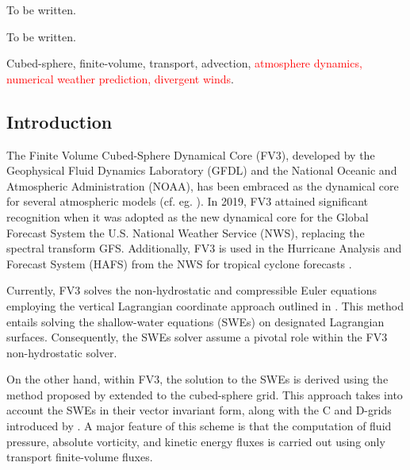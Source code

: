 \documentclass[preprint,12pt]{elsarticle}
\begin{document}
\begin{frontmatter}
\begin{highlights}
\item To be written.
\item To be written.
\end{highlights}

\begin{keyword}
Cubed-sphere,
finite-volume,
transport,
advection,
\textcolor{red}{
atmosphere dynamics,
numerical weather prediction,
divergent winds}.
\end{keyword}

\end{frontmatter}
\begin{linenumbers}


\newpage
\section{Introduction}
\label{intro}
The Finite Volume Cubed-Sphere Dynamical Core (FV3), developed by the Geophysical Fluid Dynamics Laboratory (GFDL) and the National Oceanic and Atmospheric Administration (NOAA), 
has been embraced as the dynamical core for several atmospheric models (cf. eg. \cite{zhou:2015,lee:2020, bertrand:2020,harris:2020,martin:2022,zhang:2024}).
In 2019, FV3 attained significant recognition when it was adopted as the new dynamical core for the Global Forecast System the U.S. National Weather Service (NWS), replacing the spectral transform GFS.
Additionally, FV3 is used in the Hurricane Analysis and Forecast System (HAFS) from the NWS for tropical cyclone forecasts \cite{dong:2020}.


Currently, FV3 solves the non-hydrostatic and compressible Euler equations employing the vertical Lagrangian coordinate approach outlined in \cite{lin:2004}.
This method entails solving the shallow-water equations (SWEs) on designated Lagrangian surfaces. 
Consequently, the SWEs solver assume a pivotal role within the FV3 non-hydrostatic solver.

On the other hand, within FV3, the solution to the SWEs is derived using the method proposed by \cite{lin:1997} extended to the cubed-sphere grid.
This approach takes into account the SWEs in their vector invariant form, along with the C and D-grids introduced by \cite{arakawa:1977}.
A major feature of this scheme is that the computation of fluid pressure, absolute vorticity, and kinetic energy fluxes is carried out using only transport finite-volume fluxes. 


\end{linenumbers}
\end{document}
